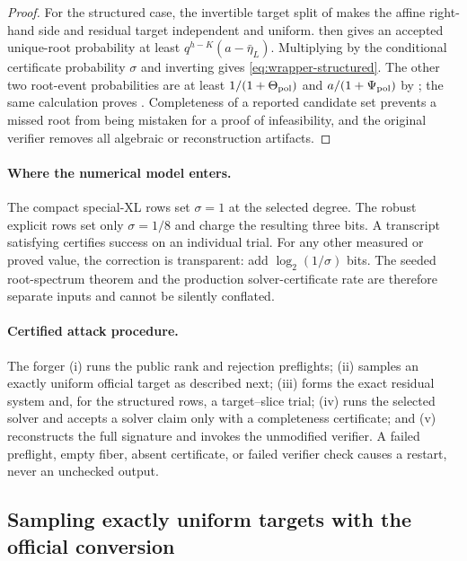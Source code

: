 \documentclass[11pt]{article}
\begin{document}
\begin{proof}
For the structured case, the invertible target split of
 makes the affine right-hand side and
residual target independent and uniform.   then
gives an accepted unique-root probability at least
$q^{h-K}(a-\bar\eta_L)$.  Multiplying by the conditional certificate
probability $\sigma$ and inverting gives \eqref{eq:wrapper-structured}.  The other two root-event probabilities are at
least $1/(1+\Theta_{\rm pol})$ and $a/(1+\Psi_{\rm pol})$ by
; the same calculation proves
.  Completeness of a reported
candidate set prevents a missed root from being mistaken for a proof of
infeasibility, and the original verifier removes all algebraic or
reconstruction artifacts.
\end{proof}

\paragraph{Where the numerical model enters.}
The compact special-XL rows set $\sigma=1$ at the selected degree.  The robust
explicit rows set only $\sigma=1/8$ and charge the resulting three bits.  A
transcript satisfying  certifies success on
an individual trial.  For any other measured or proved value, the correction
is transparent: add $\log_2(1/\sigma)$ bits.  The seeded root-spectrum theorem
and the production solver-certificate rate are therefore separate inputs and
cannot be silently conflated.

\paragraph{Certified attack procedure.}
The forger (i) runs the public rank and rejection preflights; (ii) samples an
exactly uniform official target as described next; (iii) forms the exact
residual system and, for the structured rows, a target--slice trial; (iv) runs
the selected solver and accepts a solver claim only with a completeness
certificate; and (v) reconstructs the full signature and invokes the
unmodified verifier.  A failed preflight, empty fiber, absent certificate, or
failed verifier check causes a restart, never an unchecked output.

\subsection{Sampling exactly uniform targets with the official conversion}
\end{document}
